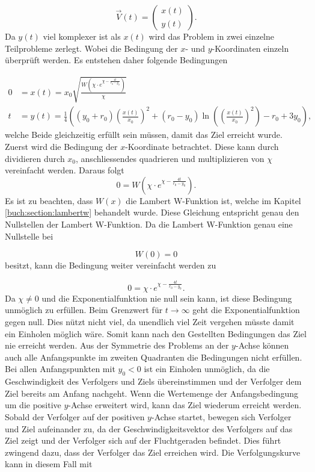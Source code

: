 \begin{equation}
    \vec{V}(t)
    =
    \left( \begin{array}{c} x(t) \\ y(t) \end{array} \right)
    \text{.}
\end{equation}
%
 Da $y(t)$ viel komplexer ist als $x(t)$ wird das Problem in zwei einzelne Teilprobleme zerlegt. Wobei die Bedingung der $x$- und $y$-Koordinaten einzeln überprüft werden. Es entstehen daher folgende Bedingungen

\begin{align*}
    0
    &=
    x(t)
    =
    x_0\sqrt{\frac{W\left(\chi\cdot e^{\chi-\frac{4t}{r_0-y_0}}\right)}{\chi}}
    \\
    t
    &=
    y(t)
    =
    \frac{1}{4}\left(\left(y_0+r_0\right)\left(\frac{x(t)}{x_0}\right)^2+\left(r_0-y_0\right)\operatorname{ln}\left(\left(\frac{x(t)}{x_0}\right)^2\right)-r_0+3y_0\right)\text{,}
\end{align*}
%
welche Beide gleichzeitig erfüllt sein müssen, damit das Ziel erreicht wurde.
Zuerst wird die Bedingung der $x$-Koordinate betrachtet.
Diese kann durch dividieren durch $x_0$, anschliessendes quadrieren und multiplizieren von $\chi$ vereinfacht werden. Daraus folgt 
\begin{equation}
	0
	=
	W\left(\chi\cdot e^{\chi-\frac{4t}{r_0-y_0}}\right)
	\text{.}
\end{equation}
%
Es ist zu beachten, dass $W(x)$ die Lambert W-Funktion ist, welche im Kapitel  \eqref{buch:section:lambertw} behandelt wurde.
Diese Gleichung entspricht genau den Nullstellen der Lambert W-Funktion. Da die Lambert W-Funktion genau eine Nullstelle bei

\begin{equation*}
    W(0)=0
\end{equation*}
%
besitzt, kann die Bedingung weiter vereinfacht werden zu

\begin{equation}
    0
    =
    \chi\cdot e^{\chi-\frac{4t}{r_0-y_0}}
    \text{.}
\end{equation}
%
Da $\chi\neq0$ und die Exponentialfunktion nie null sein kann, ist diese Bedingung unmöglich zu erfüllen.
Beim Grenzwert für $t\rightarrow\infty$ geht die Exponentialfunktion gegen null.
Dies nützt nicht viel, da unendlich viel Zeit vergehen müsste damit ein Einholen möglich wäre.
Somit kann nach den Gestellten Bedingungen das Ziel nie erreicht werden.
Aus der Symmetrie des Problems an der $y$-Achse können auch alle Anfangspunkte im zweiten Quadranten die Bedingungen nicht erfüllen.
Bei allen Anfangspunkten mit $y_0<0$ ist ein Einholen unmöglich, da die Geschwindigkeit des Verfolgers und Ziels übereinstimmen und der Verfolger dem Ziel bereits am Anfang nachgeht.
Wenn die Wertemenge der Anfangsbedingung um die positive $y$-Achse erweitert wird, kann das Ziel wiederum erreicht werden.
Sobald der Verfolger auf der positiven $y$-Achse startet, bewegen sich Verfolger und Ziel aufeinander zu, da der Geschwindigkeitsvektor des Verfolgers auf das Ziel zeigt und der Verfolger sich auf der Fluchtgeraden befindet.
Dies führt zwingend dazu, dass der Verfolger das Ziel erreichen wird.
Die Verfolgungskurve kann in diesem Fall mit

